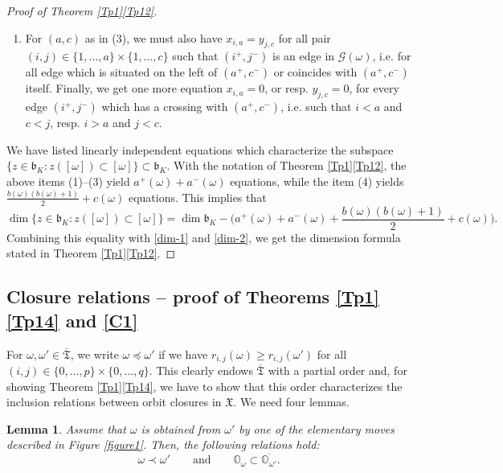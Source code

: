 \documentclass[11pt]{article}
\newtheorem{lemma}[theo]{Lemma}
\theoremstyle{definition}
\numberwithin{equation}{section}
\newcommand{\fb}{\mathfrak{b}}
\newcommand{\Xorbit}{\mathbb{O}}
\newcommand{\ppermutationsof}{\mathfrak{T}}
\newcommand{\parameters}{\overline{\ppermutationsof}}
\newcommand{\Xfv}{\mathfrak{X}}
\begin{document}
\begin{proof}[Proof of Theorem \ref{Tp1}\ref{Tp12}]
\begin{enumerate}
and we must have $y_{j,c}=0$ for all $j<c$ such that $j^-$ is a free vertex in $\mathcal{G}(\omega)$.
\item For $(a,c)$ as in (3), we must also have $x_{i,a}=y_{j,c}$ for all pair $(i,j)\in\{1,\ldots,a\}\times\{1,\ldots,c\}$ such that $(i^+,j^-)$ is an edge in $\mathcal{G}(\omega)$, i.e. for all edge which is situated on the left of $(a^+,c^-)$ or coincides with $(a^+,c^-)$ itself. Finally, we get one more equation $x_{i,a}=0$, or resp. $y_{j,c}=0$, for every edge $(i^+,j^-)$ which has a crossing with $(a^+,c^-)$, i.e. such that $i<a$ and $c<j$, resp. $i>a$ and $j<c$.
\end{enumerate}
We have listed linearly independent equations which characterize the subspace $\{z\in\fb_K:z([\omega])\subset[\omega]\}\subset\fb_K$. With the notation of Theorem \ref{Tp1}\ref{Tp12}, the above items (1)--(3) yield $a^+(\omega)+a^-(\omega)$ equations, while the item (4) yields $\frac{b(\omega)(b(\omega)+1)}{2}+c(\omega)$ equations.
This implies that
\[
\dim\{z\in\fb_K:z([\omega])\subset[\omega]\}=\dim\fb_K-\Big(a^+(\omega)+a^-(\omega)+\frac{b(\omega)(b(\omega)+1)}{2}+c(\omega)\Big).
\]
Combining this equality with \eqref{dim-1} and \eqref{dim-2}, we get the dimension formula stated in Theorem \ref{Tp1}\ref{Tp12}.
\end{proof}

\subsection{Closure relations -- proof of Theorems \ref{Tp1}\ref{Tp14} and \ref{C1}}

\label{section-3.3}

For $\omega,\omega'\in\parameters$, we write $\omega\preceq\omega'$ if we have $r_{i,j}(\omega)\geq r_{i,j}(\omega')$ for all
$(i,j)\in\{0,\ldots,p\}\times\{0,\ldots,q\}$.
This clearly endows $\parameters$ with a partial order and, for showing Theorem \ref{Tp1}\ref{Tp14}, we have to show that this order characterizes the inclusion relations between orbit closures in $\Xfv$.
We need four lemmas.

\begin{lemma}
\label{lemma-3.2}\label{L3.4}
Assume that $\omega$ is obtained from $\omega'$ by one of the elementary moves described in Figure \ref{figure1}. Then, the following relations hold:
\[\omega\prec \omega'\qquad\mbox{and}\qquad \Xorbit_\omega\subset\overline{\Xorbit_{\omega'}}.\]
\end{lemma}
\end{document}
